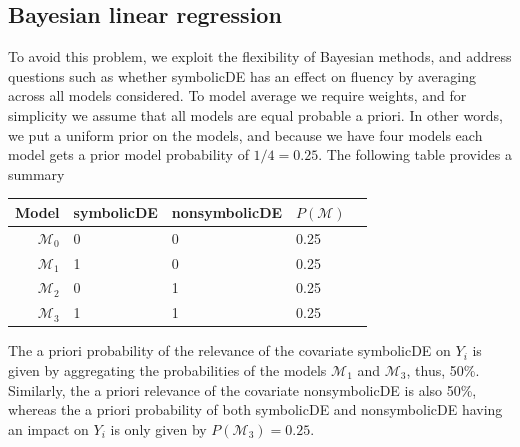 \documentclass[english,,doc,floatsintext]{apa6}
\begin{document}
\subsection{Bayesian linear regression}

To avoid this problem, we exploit the flexibility of Bayesian methods, and address questions such as whether symbolicDE has an effect on fluency by averaging across all models considered. To model average we require weights, and for simplicity we assume that all models are equal probable a priori. In other words, we put a uniform prior on the models, and because we have four models each model gets a prior model probability of \(1/ 4=0.25\). The following table provides a summary

\begin{center}
\begin{tabular}{rllll}
\hline
Model & symbolicDE & nonsymbolicDE & \( P(\mathcal{M}) \) \\
\hline
\( \mathcal{M}_{0} \) & 0 & 0 & 0.25 \\
\( \mathcal{M}_{1} \) & 1 & 0 & 0.25 \\
\( \mathcal{M}_{2} \) & 0 & 1 & 0.25 \\
\( \mathcal{M}_{3} \) & 1 & 1 & 0.25 \\
\hline
\end{tabular}
\end{center}

The a priori probability of the relevance of the covariate symbolicDE on \(Y_{i}\) is given by aggregating the probabilities of the models \(\mathcal{M}_{1}\) and \(\mathcal{M}_{3}\), thus, 50\%. Similarly, the a priori relevance of the covariate nonsymbolicDE is also 50\%, whereas the a priori probability of both symbolicDE and nonsymbolicDE having an impact on \(Y_{i}\) is only given by \(P(\mathcal{M}_{3}) = 0.25\).
\end{document}
